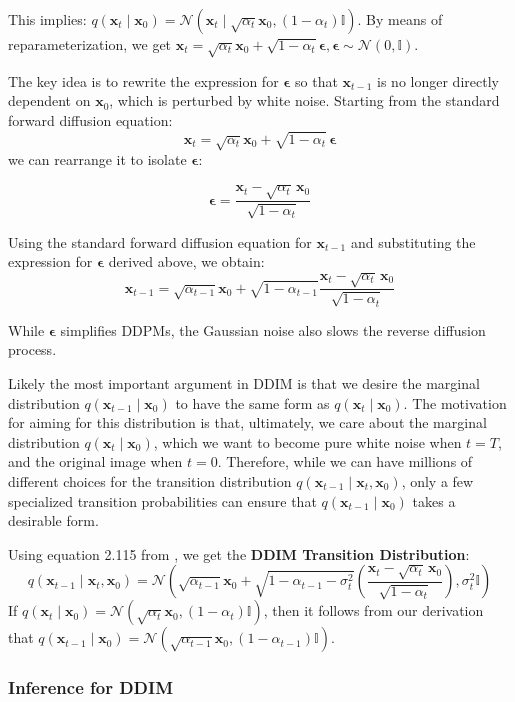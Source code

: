 \documentclass{article}
\newcommand{\x}{\mathbf{x}}
\newcommand{\N}{\mathcal{N}}
\newcommand{\eps}{\boldsymbol{\epsilon}}
\begin{document}
	This implies: $q(\x_t \mid \x_0) = \N \left( \x_t \mid \sqrt{\alpha_t} \x_0, (1 - \alpha_t) \mathbb{I} \right)$. By means of reparameterization, we get $\x_t = \sqrt{\alpha_t} \x_0 + \sqrt{1 - \alpha_t} \boldsymbol{\epsilon}, \boldsymbol{\epsilon} \sim \N (0, \mathbb{I})$.
	
	The key idea is to rewrite the expression for $\eps$ so that $\x_{t-1}$ is no longer directly dependent on $\x_0$, which is perturbed by white noise. Starting from the standard forward diffusion equation:
	$$\x_t = \sqrt{\alpha_t} \x_0 + \sqrt{1 - \alpha_t} \, \eps$$
	we can rearrange it to isolate $\eps$:
	
	$$\eps = \frac{\x_t - \sqrt{\alpha_t}\, \x_0}{\sqrt{1 - \alpha_t}}$$
	
	Using the standard forward diffusion equation for $\x_{t-1}$ and substituting the expression for $\boldsymbol{\epsilon}$ derived above, we obtain: $$\x_{t-1} = \sqrt{\alpha_{t-1}} \x_0 + \sqrt{1 - \alpha_{t-1}} \frac{\x_t - \sqrt{\alpha_t}\, \x_0}{\sqrt{1 - \alpha_t}}$$
	
	While $\eps$ simplifies DDPMs, the Gaussian noise also slows the reverse diffusion process.
	
	Likely the most important argument in DDIM is that we desire the marginal distribution $q(\x_{t-1} \mid \x_0)$ to have the same form as $q(\x_t \mid \x_0)$. The motivation for aiming for this distribution is that, ultimately, we care about the marginal distribution $q(\x_t \mid \x_0)$, which we want to become pure white noise when $t = T$, and the original image when $t = 0$. Therefore, while we can have millions of different choices for the transition distribution $q(\x_{t-1} \mid \x_t, \x_0)$, only a few specialized transition probabilities can ensure that $q(\x_{t-1} \mid \x_0)$ takes a desirable form.
	
	Using equation 2.115 from \cite{bishop2006}, we get the \textbf{DDIM Transition Distribution}:
	$$q(\x_{t-1} \mid \x_t, \x_0) = \N \left( \sqrt{\alpha_{t-1}} \x_0 + \sqrt{1 - \alpha_{t-1} - \sigma_t^2} \left( \frac{\x_t - \sqrt{\alpha_t}\, \x_0}{\sqrt{1 - \alpha_t}} \right), \sigma_t^2 \mathbb{I} \right)$$
	If $q(\x_t \mid \x_0) = \N \left( \sqrt{\alpha_t} \x_0, (1 - \alpha_t) \mathbb{I} \right)$, then it follows from our derivation that $q(\x_{t-1} \mid \x_0) = \N \left( \sqrt{\alpha_{t-1}} \x_0, (1 - \alpha_{t-1}) \mathbb{I} \right)$.
	
	\subsubsection*{Inference for DDIM}
\end{document}
